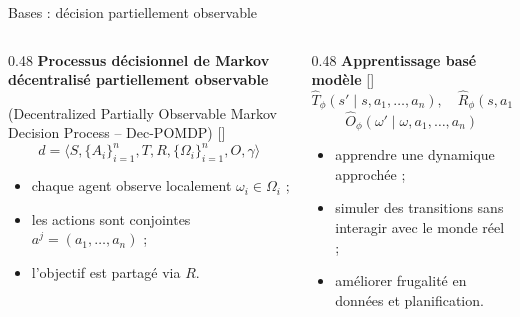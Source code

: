 \documentclass[aspectratio=169]{beamer}
\newcommand{\scite}[1]{{\normalfont\color{SpaceCyan!60!black}[\citealp{#1}]}}
\begin{document}
\begin{frame}{Bases : décision partiellement observable}
  \scriptsize
  \begin{columns}[c,totalwidth=\textwidth]
    \begin{column}{0.48\textwidth}
      \textbf{Processus décisionnel de Markov décentralisé partiellement observable}

      \vspace{0.05cm}
      (Decentralized Partially Observable Markov Decision Process -- Dec-POMDP)
      \scite{Oliehoek2016}
      \[
        d=\langle S,\{A_i\}_{i=1}^{n},T,R,\{\Omega_i\}_{i=1}^{n},O,\gamma\rangle
      \]
      \begin{itemize}
        \item chaque agent observe localement $\omega_i \in \Omega_i$ ;
        \item les actions sont conjointes $a^j=(a_1,\ldots,a_n)$ ;
        \item l'objectif est partagé via $R$.
      \end{itemize}
    \end{column}
    \begin{column}{0.48\textwidth}
      \textbf{Apprentissage basé modèle} \scite{Moerland2023modelbased,Wang2022modelbasedmultiagentreinforcementlearning}
      \[
        \hat{T}_{\phi}(s' \mid s,a_1,\ldots,a_n),
        \quad
        \hat{R}_{\phi}(s,a_1,\ldots,a_n)
      \]
      \[
        \hat{O}_{\phi}(\omega' \mid \omega,a_1,\ldots,a_n)
      \]
      \begin{itemize}
        \item apprendre une dynamique approchée ;
        \item simuler des transitions sans interagir avec le monde réel ;
        \item améliorer frugalité en données et planification.
      \end{itemize}
    \end{column}
  \end{columns}
\end{frame}
\end{document}
